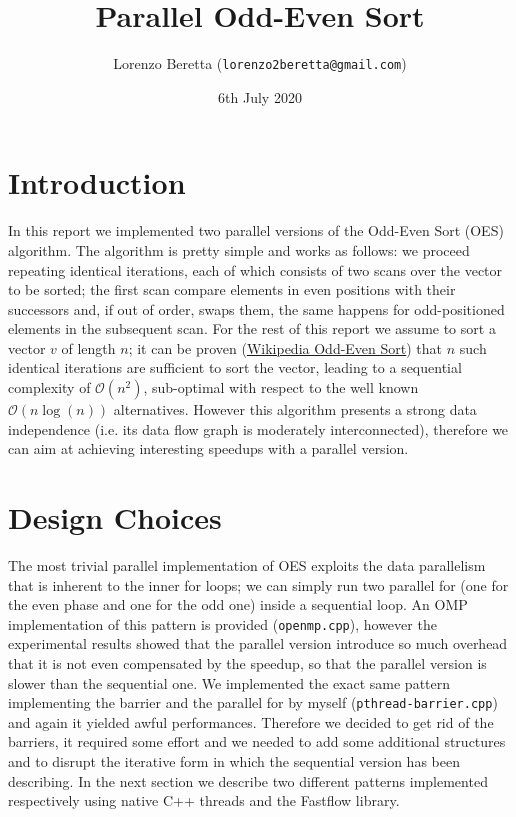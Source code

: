 \documentclass[12pt]{article}
\title{Parallel Odd-Even Sort}
\author{Lorenzo Beretta (\texttt{lorenzo2beretta@gmail.com})}
\date{6th July 2020}
\begin{document}
\maketitle

\section{Introduction}
In this report we implemented two parallel versions of the Odd-Even
Sort (OES) algorithm. The algorithm is pretty simple and works as follows:
we proceed repeating identical iterations, each of which consists of two
scans over the vector to be sorted; the first scan compare elements in
even positions with their successors and, if out of order, swaps
them, the same happens for odd-positioned elements in the subsequent
scan. For the rest of this report we assume to sort a vector $v$ of
length $n$; it can be proven
(\href{https://en.wikipedia.org/wiki/Odd\%E2\%80\%93even_sort}{Wikipedia
Odd-Even Sort})
that $n$ such identical iterations are sufficient to sort the vector,
leading to a sequential complexity of $\mathcal{O}(n^2)$, sub-optimal
with respect to the well known $\mathcal{O}(n\log(n))$ alternatives.
However this algorithm presents a strong data independence (i.e. its data
flow graph is moderately interconnected), therefore we can aim at
achieving interesting speedups with a parallel version.

\section{Design Choices}
The most trivial parallel implementation of OES exploits the data
parallelism that is inherent to the inner for loops; we can simply run
two parallel for (one for the even phase and one for the odd one)
inside a sequential loop. An OMP implementation of this pattern is
provided (\texttt{openmp.cpp}), however the experimental results
showed that the parallel version introduce so much overhead that it is not even compensated by
the speedup, so that the parallel version is slower than the
sequential one. We implemented the exact same pattern implementing the
barrier and the parallel for
by myself (\texttt{pthread-barrier.cpp}) and again it yielded awful
performances. Therefore we decided to get rid of the barriers, it
required some effort and we needed to add some additional structures
and to disrupt the iterative form in which the sequential version has
been describing. In the next section we describe two different
patterns implemented respectively using native C++ threads and the
Fastflow library.
\end{document}
